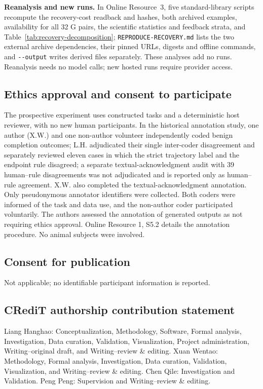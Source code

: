 \documentclass[pdflatex,sn-basic]{sn-jnl}
\begin{document}
\textbf{Reanalysis and new runs.} In Online Resource~3, five standard-library scripts recompute the recovery-cost readback and hashes, both archived examples, availability for all 32 G pairs, the scientific statistics and feedback strata, and Table~\ref{tab:recovery-decomposition}; \nolinkurl{REPRODUCE-RECOVERY.md} lists the two external archive dependencies, their pinned URLs, digests and offline commands, and \texttt{-{}-output} writes derived files separately. These analyses add no runs. Reanalysis needs no model calls; new hosted runs require provider access.

\subsection*{Ethics approval and consent to participate}
The prospective experiment uses constructed tasks and a deterministic host reviewer, with no new human participants. In the historical annotation study, one author (X.W.) and one non-author volunteer independently coded benign completion outcomes; L.H. adjudicated their single inter-coder disagreement and separately reviewed eleven cases in which the strict trajectory label and the endpoint rule disagreed; a separate textual-acknowledgment audit with 39 human--rule disagreements was not adjudicated and is reported only as human--rule agreement. X.W. also completed the textual-acknowledgment annotation. Only pseudonymous annotator identifiers were collected. Both coders were informed of the task and data use, and the non-author coder participated voluntarily. The authors assessed the annotation of generated outputs as not requiring ethics approval. Online Resource 1, S5.2 details the annotation procedure. No animal subjects were involved.

\subsection*{Consent for publication}
Not applicable; no identifiable participant information is reported.

\subsection*{CRediT authorship contribution statement}
Liang Hanghao: Conceptualization, Methodology, Software, Formal analysis, Investigation, Data curation, Validation, Visualization, Project administration, Writing--original draft, and Writing--review \& editing. Xuan Wentao: Methodology, Formal analysis, Investigation, Data curation, Validation, Visualization, and Writing--review \& editing. Chen Qile: Investigation and Validation. Peng Peng: Supervision and Writing--review \& editing.
\end{document}
